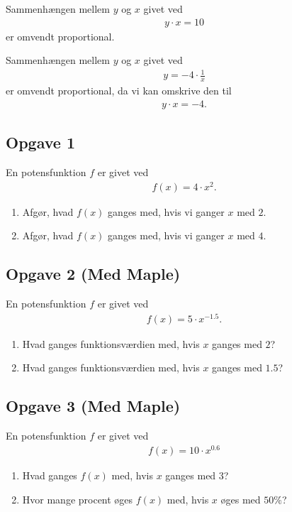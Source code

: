 \begin{exa}
	Sammenhængen mellem $y$ og $x$ givet ved
	\begin{align*}
		y\cdot x = 10
	\end{align*}
	er omvendt proportional.
\end{exa}

\begin{exa}
	Sammenhængen mellem $y$ og $x$ givet ved
	\begin{align*}
		y = -4 \cdot \frac{1}{x}
	\end{align*}
	er omvendt proportional, da vi kan omskrive den til
	\begin{align*}
		y\cdot x = -4.
	\end{align*}
\end{exa}





\subsection*{Opgave 1}
En potensfunktion $f$ er givet ved
\begin{align*}
	f(x) = 4\cdot x^2.
\end{align*}
\begin{enumerate}[label=\roman*)]
	\item Afgør, hvad $f(x)$ ganges med, hvis vi ganger $x$ med $2$.
	\item Afgør, hvad $f(x)$ ganges med, hvis vi ganger $x$ med $4$.
\end{enumerate}

\subsection*{Opgave 2 (Med Maple)}
En potensfunktion $f$ er givet ved
\begin{align*}
	f(x) = 5\cdot x^{-1.5}.
\end{align*}
\begin{enumerate}[label=\roman*)]
	\item Hvad ganges funktionsværdien med, hvis $x$ ganges med $2$?
	\item Hvad ganges funktionsværdien med, hvis $x$ ganges med $1.5$?
\end{enumerate}

\subsection*{Opgave 3 (Med Maple)}
En potensfunktion $f$ er givet ved
\begin{align*}
	f(x) = 10\cdot x^{0.6}
\end{align*}
\begin{enumerate}[label=\roman*)]
	\item Hvad ganges $f(x)$ med, hvis $x$ ganges med $3$?
	\item Hvor mange procent øges $f(x)$ med, hvis $x$ øges med $50\%$?
\end{enumerate}

